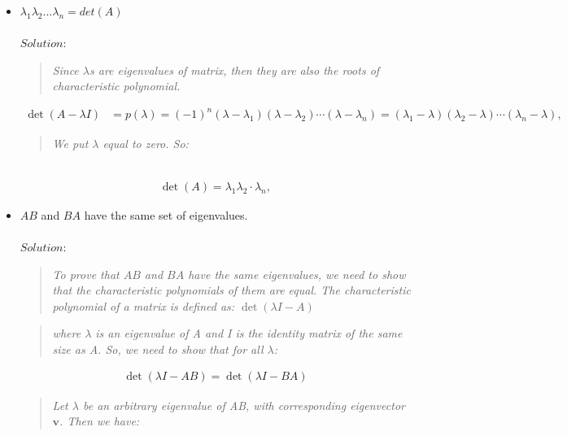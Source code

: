 \documentclass[a4paper]{article}
\begin{document}
\begin{itemize}
        \item $\lambda_{1}\lambda_{2}...\lambda_{n}=det(A)$\\
        \\
        $Solution:$ \\
        \begin{quote}
            \emph{Since $\lambda$s are eigenvalues of matrix, then they are also the roots of characteristic polynomial.}
        \end{quote}
        \begin{align*} \det(A - \lambda I) &= p(\lambda) = (-1)^n (\lambda - \lambda_1)(\lambda - \lambda_2) \cdots (\lambda - \lambda_n) = (\lambda_1 - \lambda)(\lambda_2 - \lambda) \cdots (\lambda_n - \lambda), \end{align*}
        \begin{quote}
            \emph{We put $\lambda$ equal to zero. So: }
        \end{quote}\\
        \begin{align*} \det(A) = \lambda_1 \lambda_2 \cdot \lambda_n, \end{align*}
        \vspace*{2}
        \item $AB$ and $BA$ have the same set of eigenvalues. \\
        \\
        $Solution:$ 
        \begin{quote}
            \emph{To prove that $AB$ and $BA$ have the same eigenvalues, we need to show that the characteristic polynomials of them are equal. The characteristic polynomial of a matrix is defined as: $\det(\lambda I - A)$}
        \end{quote}
        
        \begin{quote}
            \emph{where $\lambda$ is an eigenvalue of A and I is the identity matrix of the same size as A. So, we need to show that for all $\lambda$:}
        \end{quote}

        \begin{align*} \det(\lambda I - AB) = \det(\lambda I - BA) \end{align*}
        
        \begin{quote}
            \emph{Let $\lambda$ be an arbitrary eigenvalue of AB, with corresponding eigenvector $\mathbf{v}$. Then we have:}
        \end{quote}
        

\end{itemize}
\end{document}
